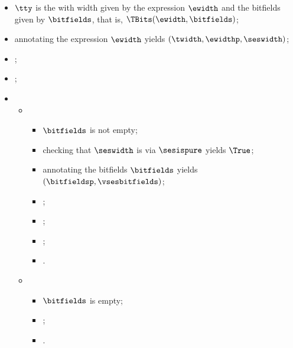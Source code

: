 \ProseParagraph
\AllApply
\begin{itemize}
  \item $\tty$ is the \bitvectortypeterm{} with width given by the expression
    $\ewidth$ and the bitfields given by $\bitfields$, that is, $\TBits(\ewidth, \bitfields)$;
  \item annotating the expression $\ewidth$ yields $(\twidth, \ewidthp, \seswidth)$\ProseOrTypeError;
  \item \Prosechecksymbolicallyevaluable{\seswidth};
  \item \Prosecheckconstrainedinteger{$\tenv$}{$\twidth$};
  \item \OneApplies
  \begin{itemize}
    \item {}
    \begin{itemize}
      \item $\bitfields$ is not empty;
      \item checking that $\seswidth$ is \pureterm{} via $\sesispure$ yields $\True$\ProseTerminateAs{\SideEffectViolation};
      \item annotating the bitfields $\bitfields$ yields \\
            $(\bitfieldsp, \vsesbitfields)$\ProseOrTypeError;
      \item \Prosestaticeval{$\tenv$}{$\ewidthp$}{$\LInt(\vwidth)$};
      \item \Prosecheckcommonbitfieldsalign{$\tenv$}{$\bitfieldsp$}{$\vwidth$}\ProseOrTypeError;
      \item {};
      \item {}.
    \end{itemize}

    \item {}
    \begin{itemize}
      \item $\bitfields$ is empty;
      \item {};
      \item \Proseeqdef{$\vses$}{$\seswidth$}.
    \end{itemize}
  \end{itemize}
\end{itemize}

